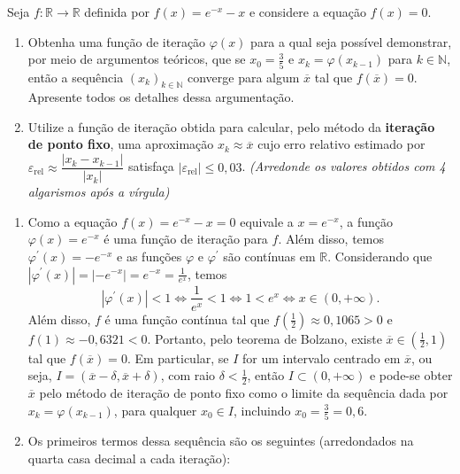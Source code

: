 \documentclass[12pt,a4paper]{article}
\begin{document}
\begin{ExerciseList}
\Exercise[title={2,5}] Seja \(f:\mathbb{R} \to \mathbb{R}\) definida por \(f(x) = e^{-x} - x\) e considere a equação \(f(x) = 0\).
\begin{enumerate}
    \item Obtenha uma função de iteração \(\varphi(x)\) para a qual seja possível demonstrar, por meio de argumentos teóricos, que se \(x_0 = \frac{3}{5}\) e \(x_k = \varphi(x_{k-1})\) para \(k \in \mathbb{N}\), então a sequência \((x_k)_{k \in \mathbb{N}}\) converge para algum \(\overline{x}\) tal que \(f(\overline{x}) = 0\). Apresente todos os detalhes dessa argumentação.
    \item Utilize a função de iteração obtida para calcular, pelo método da \textbf{iteração de ponto fixo}, uma aproximação \(x_k \approx \overline{x}\) cujo erro relativo estimado por \(\varepsilon_{\text{rel}} \approx \dfrac{|x_k - x_{k-1}|}{|x_k|}\) satisfaça \(|\varepsilon_{\text{rel}}| \leq 0,03\). {\color{blue} \textit{(Arredonde os valores obtidos com 4 algarismos após a vírgula)}}
\end{enumerate}
\Answer \begin{enumerate}
\item Como a equação \(f(x) = e^{-x} - x = 0\) equivale a \(x = e^{-x}\), a função \(\varphi(x) = e^{-x}\) é uma função de iteração para \(f\). Além disso, temos \(\varphi^\prime(x) = -e^{-x}\) e as funções \(\varphi\) e \(\varphi^\prime\) são contínuas em \(\mathbb{R}\). Considerando que \( |\varphi^\prime(x)| = \left|-e^{-x}\right| = e^{-x} = \frac{1}{e^x} \), temos
\[
|\varphi^\prime(x)| < 1
\Leftrightarrow
\frac{1}{e^x} < 1
\Leftrightarrow
1 < e^x
\Leftrightarrow
x \in (0, +\infty).
\]
Além disso, \(f\) é uma função contínua tal que \(f\left(\frac{1}{2}\right) \approx 0,1065 > 0\) e \(f(1) \approx -0,6321 < 0\). Portanto, pelo teorema de Bolzano, existe \(\overline{x} \in \left(\frac{1}{2}, 1\right)\) tal que \(f(\overline{x}) = 0\). Em particular, se \(I\) for um intervalo centrado em \(\overline{x}\), ou seja, \(I = \left(\overline{x}-\delta, \overline{x}+\delta\right)\), com raio \(\delta < \frac{1}{2}\), então \(I \subset (0, +\infty)\) e pode-se obter \(\overline{x}\) pelo método de iteração de ponto fixo como o limite da sequência dada por \(x_k = \varphi(x_{k-1})\), para qualquer \(x_0 \in I\), incluindo \(x_0 = \frac{3}{5} = 0,6\).

\item Os primeiros termos dessa sequência são os seguintes (arredondados na quarta casa decimal a cada iteração):


\end{enumerate}
\end{ExerciseList}
\end{document}
